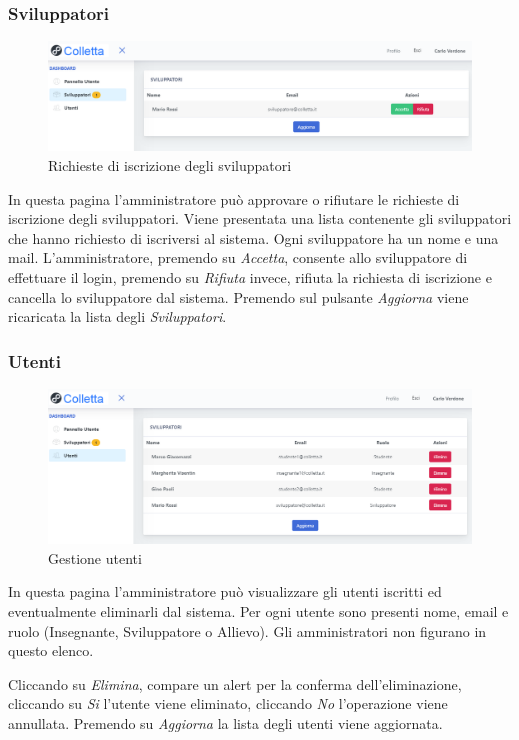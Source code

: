 		\subsubsection{Sviluppatori}
			\begin{figure}[H]
				\centering
				\includegraphics[width=17cm]{sez/img/amministratore/conf_ric_svil.PNG}
				\caption{Richieste di iscrizione degli sviluppatori}\label{fig:1}
			\end{figure}
		  In questa pagina l'amministratore può approvare o rifiutare le richieste di iscrizione degli sviluppatori. Viene presentata una lista contenente gli sviluppatori che hanno richiesto di iscriversi al sistema. Ogni sviluppatore ha un nome e una mail. L'amministratore, premendo su \textit{Accetta}, consente allo sviluppatore di effettuare il login, premendo su \textit{Rifiuta} invece, rifiuta la richiesta di iscrizione e cancella lo sviluppatore dal sistema. Premendo sul pulsante \textit{Aggiorna} viene ricaricata la lista degli \textit{Sviluppatori}.


		\subsubsection{Utenti}
			\begin{figure}[H]
				\centering
				\includegraphics[width=17cm]{sez/img/amministratore/gestisciutenti.PNG}
				\caption{Gestione utenti}\label{fig:1}
			\end{figure}
		  In questa pagina l'amministratore può visualizzare gli utenti iscritti ed eventualmente eliminarli dal sistema. Per ogni utente sono presenti nome, email e ruolo (Insegnante, Sviluppatore o Allievo). Gli amministratori non figurano in questo elenco. 
		  
		  Cliccando su \textit{Elimina}, compare un alert per la conferma dell'eliminazione, cliccando su \textit{Si} l'utente viene eliminato, cliccando \textit{No} l'operazione viene annullata. Premendo su \textit{Aggiorna} la lista degli utenti viene aggiornata.
